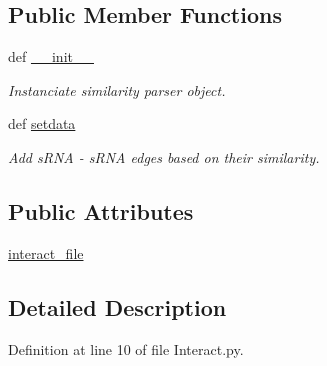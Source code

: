 \subsection*{\-Public \-Member \-Functions}
\begin{DoxyCompactItemize}
\item 
def \hyperlink{classirna_1_1David2tulip_1_1Interact_1_1Interact_ac17a8e6d4dadb6efb7c9cbe7eabd89a9}{\-\_\-\-\_\-init\-\_\-\-\_\-}
\begin{DoxyCompactList}\small\item\em \-Instanciate similarity parser object. \end{DoxyCompactList}\item 
def \hyperlink{classirna_1_1David2tulip_1_1Interact_1_1Interact_a2a482903a0c6d73efd368a36a8693b85}{setdata}
\begin{DoxyCompactList}\small\item\em \-Add s\-R\-N\-A -\/ s\-R\-N\-A edges based on their similarity. \end{DoxyCompactList}\end{DoxyCompactItemize}
\subsection*{\-Public \-Attributes}
\begin{DoxyCompactItemize}
\item 
\hyperlink{classirna_1_1David2tulip_1_1Interact_1_1Interact_ad64c3b05ee0087ffc17515c2dc34d95a}{interact\-\_\-file}
\end{DoxyCompactItemize}


\subsection{\-Detailed \-Description}


\-Definition at line 10 of file \-Interact.\-py.



